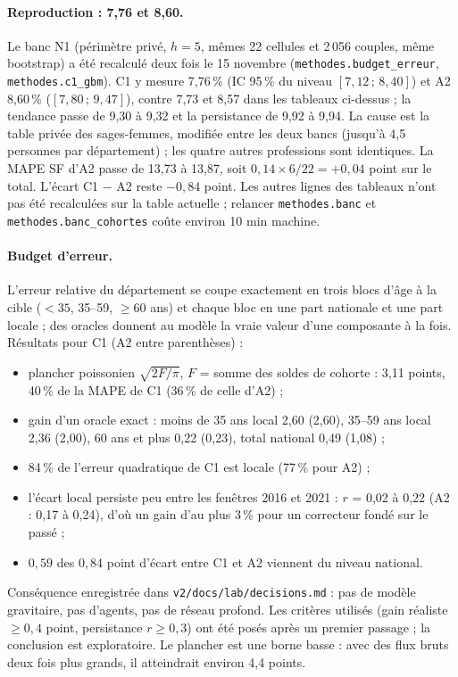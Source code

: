 \documentclass[11pt]{article}
\begin{document}
\paragraph{Reproduction : 7,76 et 8,60.} Le banc N1 (périmètre privé, $h = 5$, mêmes 22 cellules et
2\,056 couples, même bootstrap) a été recalculé deux fois le 15 novembre (\texttt{methodes.budget\_erreur},
\texttt{methodes.c1\_gbm}). C1 y mesure 7,76\,\%\mesure{} (IC 95\,\% du niveau $[7{,}12\,;\,8{,}40]$\mesure) et
A2 8,60\,\%\mesure{} ($[7{,}80\,;\,9{,}47]$\mesure), contre 7,73 et 8,57 dans les tableaux ci-dessus ; la
tendance passe de 9,30 à 9,32\mesure{} et la persistance de 9,92 à 9,94\mesure. La cause est la table
privée des sages-femmes, modifiée entre les deux bancs (jusqu'à 4,5\mesure{} personnes par département) ;
les quatre autres professions sont identiques. La MAPE SF d'A2 passe de 13,73 à 13,87\mesure, soit
$0{,}14 \times 6/22 = +0{,}04$\derive{} point sur le total. L'écart C1 $-$ A2 reste $-0{,}84$\derive{} point.
Les autres lignes des tableaux n'ont pas été recalculées sur la table actuelle ; relancer
\texttt{methodes.banc} et \texttt{methodes.banc\_cohortes} coûte environ 10\suppose{} min machine.

\paragraph{Budget d'erreur.} L'erreur relative du département se coupe exactement en trois blocs d'âge à la
cible ($<35$, 35--59, $\ge 60$ ans) et chaque bloc en une part nationale et une part locale ; des oracles
donnent au modèle la vraie valeur d'une composante à la fois. Résultats pour C1 (A2 entre parenthèses) :
\begin{itemize}
  \item plancher poissonien $\sqrt{2F/\pi}$, $F$ = somme des soldes de cohorte : 3,11\derive{} points,
        40\,\%\derive{} de la MAPE de C1 (36\,\% de celle d'A2) ;
  \item gain d'un oracle exact : moins de 35 ans local 2,60\mesure{} (2,60), 35--59 ans local
        2,36\mesure{} (2,00), 60 ans et plus 0,22\mesure{} (0,23), total national 0,49\mesure{} (1,08) ;
  \item 84\,\%\mesure{} de l'erreur quadratique de C1 est locale (77\,\% pour A2) ;
  \item l'écart local persiste peu entre les fenêtres 2016 et 2021 : $r$ = 0,02 à 0,22\mesure{} (A2 : 0,17
        à 0,24), d'où un gain d'au plus 3\,\%\derive{} pour un correcteur fondé sur le passé ;
  \item $0{,}59$ des $0{,}84$ point d'écart entre C1 et A2 viennent du niveau national\derive.
\end{itemize}
Conséquence enregistrée dans \texttt{v2/docs/lab/decisions.md} : pas de modèle gravitaire, pas d'agents, pas
de réseau profond. Les critères utilisés (gain réaliste $\ge 0{,}4$ point, persistance $r \ge 0{,}3$) ont été
posés après un premier passage ; la conclusion est exploratoire. Le plancher est une borne basse : avec des
flux bruts deux fois plus grands, il atteindrait environ 4,4\suppose{} points.
\end{document}
